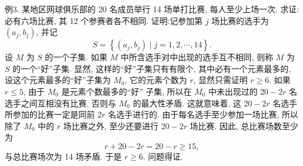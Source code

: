 例3. 某地区网球俱乐部的 20 名成员举行 14 场单打比赛, 每人至少上场一次.
求证: 必有六场比赛, 其 12 个参赛者各不相同.
证明:记参加第 $j$ 场比赛的选手为 $\left(a_j, b_j\right)$, 并记
$$
S=\left\{\left(a_j, b_j\right) \mid j=1,2, \cdots, 14\right\} .
$$
设 $M$ 为 $S$ 的一个子集.
如果 $M$ 中所含选手对中出现的选手互不相同, 则称 $M$ 为 $S$ 的一个“好”子集.
显然, 这样的“好”子集只有有限个, 其中必有一个元素最多的, 设这个元素最多的“好”子集为 $M_0$, 它的元素个数为 $r$, 显然只需证明 $r \geqslant 6$.
如果 $r \leqslant 5$, 由于 $M_0$ 是元素个数最多的“好” 子集, 所以在 $M_0$ 中未出现过的 $20-2r$ 名选手之间互相没有比赛, 否则与 $M_0$ 的最大性矛盾.
这就意味着, 这 $20-2 r$ 名选手所参加的比赛一定是同前 $2 r$ 名选手进行的.
由于每名选手至少参加一场比赛, 所以除了 $M_0$ 中的 $r$ 场比赛之外, 至少还要进行 $20-2 r$ 场比赛.
因此, 总比赛场数至少为
$$
r+20-2 r=20-r \geqslant 15,
$$
与总比赛场次为 14 场矛盾.
于是 $r \geqslant 6$. 问题得证.




